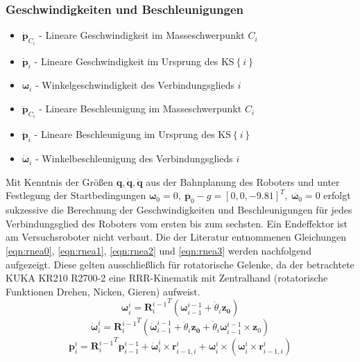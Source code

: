 \subsubsection*{Geschwindigkeiten und Beschleunigungen}
\begin{itemize}
	\item $ \dot{\boldsymbol{p}}_{C_i} $ - Lineare Geschwindigkeit im Masseschwerpunkt $ C_i $ 
	\item $ \dot{\boldsymbol{p}}_i $ - Lineare Geschwindigkeit im Ursprung des KS$\left\{i\right\}$
	\item $ \boldsymbol{\omega}_i $ - Winkelgeschwindigkeit des Verbindungsglieds $i$
	\item $ \ddot{\boldsymbol{p}}_{C_i} $ - Lineare Beschleunigung im Masseschwerpunkt $ C_i $
	\item $ \ddot{\boldsymbol{p}}_i $ - Lineare Beschleunigung im Ursprung des KS$\left\{i\right\}$
	\item $ \boldsymbol{\dot{\omega}}_i $ - Winkelbeschleunigung des Verbindungsglieds $i$
\end{itemize}
%
Mit Kenntnis der Größen $\bm{q}, \dot{\bm{q}}, \ddot{\bm{q}}$ aus der Bahnplanung des Roboters und unter Festlegung der Startbedingungen $\bm{\omega}_0 = 0,~ \ddot{\bm{p}_0}-g = [0,0,-9.81]^T,~ \ddot{\bm{\omega}_0} = 0$  erfolgt sukzessive die Berechnung der Geschwindigkeiten und Beschleunigungen für jedes Verbindungsglied des Roboters vom ersten bis zum sechsten. Ein Endeffektor ist am Versuchsroboter nicht verbaut. Die der Literatur  \cite[S.~287~f.]{Grimble.2009} entnommenen Gleichungen \ref{eqn:rnea0}, \ref{eqn:rnea1}, \ref{eqn:rnea2} und  \ref{eqn:rnea3} werden nachfolgend aufgezeigt. Diese gelten ausschließlich für rotatorische Gelenke, da der betrachtete KUKA KR210 R2700-2 eine RRR-Kinematik mit Zentralhand (rotatorische Funktionen Drehen, Nicken, Gieren) aufweist. 
%
\begin{equation}
	\label{eqn:rnea0}
	\bm{\omega}^i_i = {\bm{R}^{i-1}_i}^T  \left( \bm{\omega}^{i-1}_{i-1} +\dot{\theta}_i\bm{z_0} \right)
\end{equation}
%
\begin{equation}
	\label{eqn:rnea1}
	\dot{\bm{\omega}}^i_i = {\bm{R}^{i-1}_i}^T  \left( \dot{\bm{\omega}}^{i-1}_{i-1} +\ddot{\theta}_i\bm{z_0} +\dot{{\theta}}_i\bm{\omega}^{i-1}_{i-1} \times \bm{z}_0 \right)
\end{equation}
%
\begin{equation}
	\label{eqn:rnea2}
	\ddot{\bm{p}}^i_i = {\bm{R}^{i-1}_i}^T  \ddot{\bm{p}}^{i-1}_{i-1} + \dot{\bm{\omega}}^{i}_{i} \times \bm{r}^{i}_{i-1,i} + {\bm{\omega}}^{i}_{i} \times \left(  {\bm{\omega}}^{i}_{i} \times \bm{r}^{i}_{i-1,i} \right)
\end{equation}
